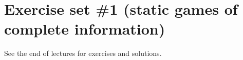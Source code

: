 \section{Exercise set \#1 (static games of complete information)}

\begin{center}
    See the end of lectures for exercises and solutions.
\end{center}